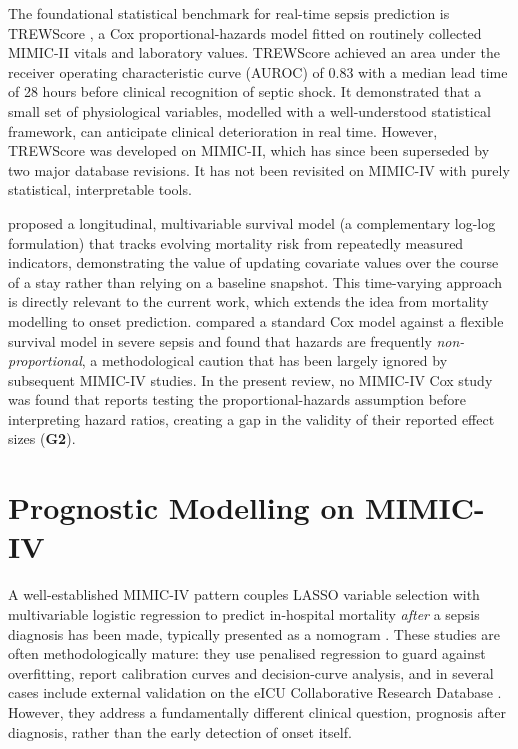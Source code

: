 The foundational statistical benchmark for real-time sepsis prediction is
TREWScore \cite{henry2015trewscore}, a Cox proportional-hazards model fitted on
routinely collected MIMIC-II vitals and laboratory values. TREWScore achieved an
area under the receiver operating characteristic curve (AUROC) of 0.83 with a
median lead time of 28 hours before clinical recognition of septic shock. It
demonstrated that a small set of physiological variables, modelled with a
well-understood statistical framework, can anticipate clinical deterioration in
real time. However, TREWScore was developed on MIMIC-II, which has since been
superseded by two major database revisions. It has not been revisited on
MIMIC-IV with purely statistical, interpretable tools.

\textcite{liaw2019mortality} proposed a longitudinal,
multivariable survival model (a complementary log-log formulation) that tracks
evolving mortality risk from repeatedly measured indicators, demonstrating the
value of updating covariate values over the course of a stay rather than relying
on a baseline snapshot. This
time-varying approach is directly relevant to the current work, which extends
the idea from mortality modelling to onset prediction.
\textcite{kasal2004cox} compared a standard Cox model against a flexible survival
model in severe sepsis and found that hazards are frequently
\emph{non-proportional}, a methodological caution that has been largely ignored
by subsequent MIMIC-IV studies. In the present review, no MIMIC-IV Cox study was
found that reports testing the proportional-hazards assumption before
interpreting hazard ratios, creating a gap in the validity of their reported
effect sizes (\textbf{G2}).

\section{Prognostic Modelling on MIMIC-IV}
\label{sec:prog}

A well-established MIMIC-IV pattern couples LASSO variable selection with
multivariable logistic regression to predict in-hospital mortality
\emph{after} a sepsis diagnosis has been made, typically presented as a
nomogram \cite{yuan2023nomogram}. These studies are often methodologically
mature: they use penalised regression to guard against overfitting, report
calibration curves and decision-curve analysis, and in several cases include
external validation on the eICU Collaborative Research Database
\cite{pollard2018eicu}. However, they address a fundamentally different clinical
question, prognosis after diagnosis, rather than the early detection of
onset itself.


